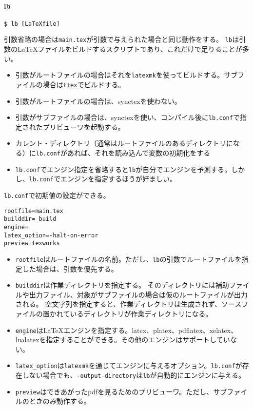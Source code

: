 \hypertarget{lb}{%
\paragraph{lb}\label{lb}}

\begin{verbatim}
$ lb [LaTeXfile]
\end{verbatim}

引数省略の場合は\texttt{main.tex}が引数で与えられた場合と同じ動作をする。
\texttt{lb}は引数のLaTeXファイルをビルドするスクリプトであり、これだけで足りることが多い。

\begin{itemize}
\tightlist
\item
  引数がルートファイルの場合はそれを\texttt{latexmk}を使ってビルドする。サブファイルの場合は\texttt{ttex}でビルドする。
\item
  引数がルートファイルの場合は、synctexを使わない。
\item
  引数がサブファイルの場合は、synctexを使い、コンパイル後に\texttt{lb.conf}で指定されたプリビューワを起動する。
\item
  カレント・ディレクトリ（通常はルートファイルのあるディレクトリになる）に\texttt{lb.conf}があれば、それを読み込んで変数の初期化をする
\item
  \texttt{lb.conf}でエンジン指定を省略すると\texttt{lb}が自分でエンジンを予測する。しかし、\texttt{lb.conf}でエンジンを指定するほうが好ましい。
\end{itemize}

\texttt{lb.conf}で初期値の設定ができる。

\begin{verbatim}
rootfile=main.tex
builddir=_build
engine=
latex_option=-halt-on-error
preview=texworks
\end{verbatim}

\begin{itemize}
\tightlist
\item
  \texttt{rootfile}はルートファイルの名前。ただし、\texttt{lb}の引数でルートファイルを指定した場合は、引数を優先する。
\item
  \texttt{builddir}は作業ディレクトリを指定する。
  そのディレクトリには補助ファイルや出力ファイル、対象がサブファイルの場合は仮のルートファイルが出力される。
  空文字列を指定すると、作業ディレクトリは生成されず、ソースファイルの置かれているディレクトリが作業ディレクトリになる。
\item
  \texttt{engine}はLaTeXエンジンを指定する。latex、platex、pdflatex、xelatex、lualatexを指定することができる。その他のエンジンはサポートしていない。
\item
  \texttt{latex\_option}は\texttt{latexmk}を通じてエンジンに与えるオプション。\texttt{lb.conf}が存在しない場合でも、\texttt{-output-directory}は\texttt{lb}が自動的にエンジンに与える。
\item
  \texttt{preview}はできあがったpdfを見るためのプリビューワ。ただし、サブファイルのときのみ動作する。
\end{itemize}

